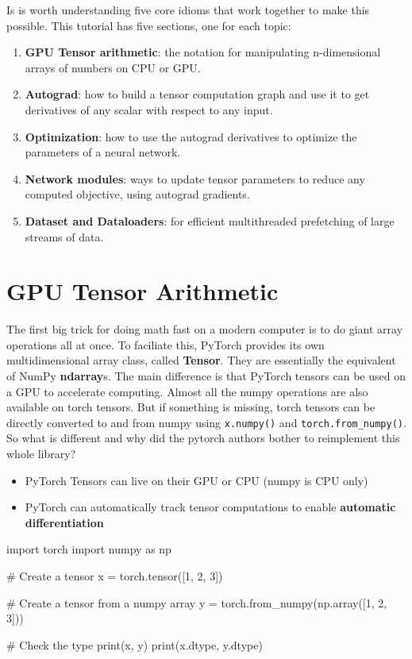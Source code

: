 Is is worth understanding five core idioms that work together to make this possible.  This tutorial has five sections, one for each topic:

\begin{enumerate}
    \item \textbf{GPU Tensor arithmetic}: the notation for manipulating n-dimensional arrays of numbers on CPU or GPU.
    \item \textbf{Autograd}: how to build a tensor computation graph and use it to get derivatives of any scalar with respect to any input.
    \item \textbf{Optimization}: how to use the autograd derivatives to optimize the parameters of a neural network.
    \item \textbf{Network modules}: ways to update tensor parameters to reduce any computed objective, using autograd gradients.
    \item \textbf{Dataset and Dataloaders}: for efficient multithreaded prefetching of large streams of data.
\end{enumerate}

\section{GPU Tensor Arithmetic}
The first big trick for doing math fast on a modern computer is to do giant array operations all at once.
To faciliate this, PyTorch provides its own multidimensional array class, called \textbf{Tensor}. They are essentially the equivalent of NumPy \textbf{ndarray}s. The main difference is that PyTorch tensors can be used on a GPU to accelerate computing.
Almost all the numpy operations are also available on torch tensors. But if something is missing, torch tensors can be directly converted to and from numpy using \texttt{x.numpy()} and \texttt{torch.from\_numpy()}. So what is different and why did the pytorch authors bother to reimplement this whole library?
\begin{itemize}
    \item PyTorch Tensors can live on their GPU or CPU (numpy is CPU only)
    \item PyTorch can automatically track tensor computations to enable \textbf{automatic differentiation}
\end{itemize}

\begin{exampleblock}[Tensors]
    \begin{codeblock}[language=python]
import torch
import numpy as np 

# Create a tensor
x = torch.tensor([1, 2, 3])

# Create a tensor from a numpy array
y = torch.from_numpy(np.array([1, 2, 3]))

# Check the type
print(x, y)
print(x.dtype, y.dtype)
    \end{codeblock}
\end{exampleblock}

